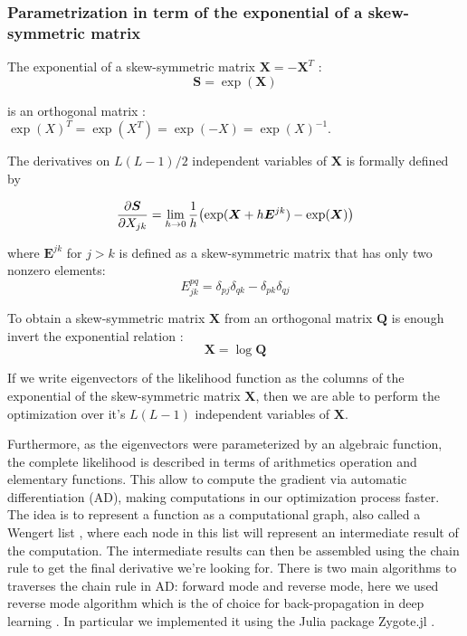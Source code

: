 \documentclass[preprint,amsmath,amssymb,superscriptaddress,showpacs,pre]{revtex4-1}
\let\originalleft\left
\let\originalright\right
\renewcommand{\left}{\mathopen{}\mathclose\bgroup\originalleft}
\renewcommand{\right}{\aftergroup\egroup\originalright}
\begin{document}
\subsubsection{Parametrization in term of the exponential of a skew-symmetric matrix }
The exponential of a skew-symmetric matrix $\bm X=-\bm X^T$  : 
 \begin{equation}
 \bm S=\exp (\bm X)
 \end{equation}

 is  an  orthogonal  matrix : $\exp(X)^T=\exp(X^T)=\exp(-X)=\exp(X)^{-1}$. 

 The derivatives on $L(L-1)/2$ independent variables of $\bm X$  is formally defined by

 \begin{equation}
 \frac{\partial \bm S}{\partial X_{jk}}=\lim_{h\rightarrow 0} \frac{1}{h} \left( \exp(\bm X+ h \bm E^{jk}) - \exp(\bm X)\right) 
 \end{equation}

 where $\bm E^{jk}$ for $j > k$ is defined as a skew-symmetric matrix that has only two nonzero elements:
 \begin{equation}
 E^{pq}_{jk}=\delta_{pj}\delta_{qk}-\delta_{pk}\delta_{qj}
 \end{equation}

To obtain   a skew-symmetric matrix    $\bm X$ from an orthogonal matrix $\bm Q$    is enough invert the exponential relation :
 $$\bm X=\log \bm Q$$

  If we write eigenvectors of the likelihood function as the columns of the exponential of the skew-symmetric matrix $\bm X$, then we are able to perform the optimization over it's $L(L-1)$ independent variables of $\bm X$.

 Furthermore, as the eigenvectors were parameterized by an algebraic function, the complete likelihood  is described in terms of arithmetics operation and elementary functions. This allow to compute  the gradient via  automatic differentiation (AD), making computations in our optimization process faster. 
 The idea  is to represent a function as a computational graph, also called a Wengert list , where each node  in this list will represent an intermediate result of the computation. The intermediate results can then be assembled using the chain rule to get the final derivative we’re looking for. There is two    main algorithms  to traverses the chain rule in AD: forward mode and reverse mode, here we used reverse mode  algorithm  which is the of choice for back-propagation in deep learning . In particular we implemented  it using the Julia package Zygote.jl . 
\end{document}
